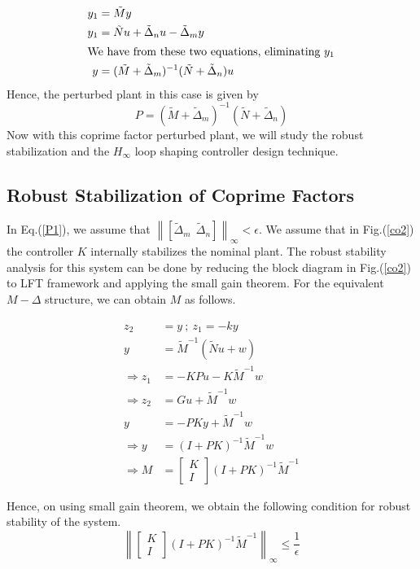\documentclass[a4paper,12pt]{article}
\newcommand\norm[1]{\left\lVert#1\right\rVert}
\begin{document}
	\begin{align}
	y_{1}&=\tilde{M}y\\
	y_{1}&=\tilde{N}u + \tilde{\Delta}_{n}u - \tilde{\Delta}_{m}y\\
	\intertext{We have from these two equations, eliminating $y_{1}$} 
	y&=(\tilde{M} + \tilde{\Delta}_{m})^{-1}(\tilde{N}+\tilde{\Delta}_{n})u
	\end{align}
	Hence, the perturbed plant in this case is given by
	\begin{equation}
		\label{P1}
		P =(\tilde{M} + \tilde{\Delta}_{m})^{-1}(\tilde{N}+\tilde{\Delta}_{n})
	 \end{equation}
	 Now with this coprime factor perturbed plant, we will study the robust stabilization and the $H_{\infty}$ loop shaping controller design technique.
	\subsection{Robust Stabilization of Coprime Factors} In Eq.(\ref{P1}), we assume that $\norm{[\tilde{\Delta}_{m} \:\: \tilde{\Delta}_{n}]}_{\infty} < \epsilon$. We assume that in Fig.(\ref{co2}) the controller $K$ internally stabilizes the nominal plant. The robust stability analysis for this system can be done by reducing the block diagram in Fig.(\ref{co2}) to LFT framework and applying the small gain theorem. For the equivalent $M-\Delta$ structure, we can obtain $M$ as follows.
	
	
	\begin{align*}
	z_{2}&=y \: ; \: z_{1} = -ky \\
	y&=\tilde{M}^{-1}(\tilde{N}u + w)\\
	\Rightarrow z_{1} &= -KPu-K\tilde{M}^{-1}w\\
	\Rightarrow z_{2} &= Gu + \tilde{M}^{-1}w\\
	y&=-PKy+\tilde{M}^{-1}w\\
	\Rightarrow y&=(I+PK)^{-1}\tilde{M}^{-1}w\\
	\Rightarrow M&=\begin{bmatrix}
	K \\ I
	\end{bmatrix}
	(I+PK)^{-1}\tilde{M}^{-1}
	\end{align*}	 
	
	Hence, on using small gain theorem, we obtain the following condition for robust stability of the system.
	\begin{equation}
	\norm{\begin{bmatrix}
	K \\ I
	\end{bmatrix}
	(I+PK)^{-1}\tilde{M}^{-1}}_{\infty} \leq \frac{1}{\epsilon}	
	\end{equation}
	
\end{document}
